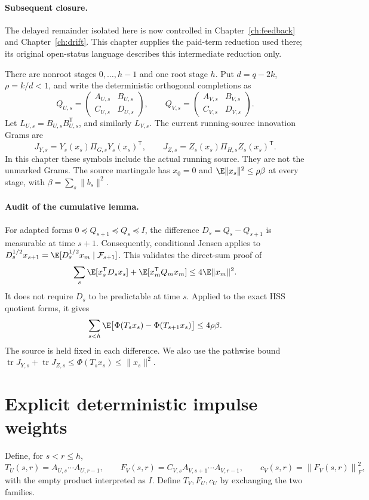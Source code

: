 \documentclass[11pt,oneside,openany,a4paper]{book}
\numberwithin{equation}{chapter}
\theoremstyle{definition}
\theoremstyle{remark}
\newcommand{\T}{\mathsf T}\newcommand{\Id}{I}
\newcommand{\F}[1]{\left\lVert#1\right\rVert_F}
\DeclareMathOperator{\tr}{tr}\DeclareMathOperator{\rank}{rank}
\begin{document}
\paragraph{Subsequent closure.}
The delayed remainder isolated here is now controlled in
Chapter~\ref{ch:feedback} and
Chapter~\ref{ch:drift}. This chapter supplies
the paid-term reduction used there; its original open-status language
describes this intermediate reduction only.

There are nonroot stages $0,\ldots,h-1$ and one root stage $h$.
Put $d=q-2k$, $\rho=k/d<1$, and write the deterministic orthogonal
completions as
\[
 Q_{U,s}=\begin{pmatrix}A_{U,s}&B_{U,s}\\C_{U,s}&D_{U,s}\end{pmatrix},
 \qquad
 Q_{V,s}=\begin{pmatrix}A_{V,s}&B_{V,s}\\C_{V,s}&D_{V,s}\end{pmatrix}.
\]
Let $L_{U,s}=B_{U,s}B_{U,s}^{\T}$, and similarly $L_{V,s}$.
The current running-source innovation Grams are
\[
 J_{Y,s}=Y_s(x_s)\Pi_{G,s}Y_s(x_s)^{\T},\qquad
 J_{Z,s}=Z_s(x_s)\Pi_{H,s}Z_s(x_s)^{\T}.
\]
In this chapter these symbols include the actual running source. They are
not the unmarked Grams. The source martingale has $x_0=0$ and
$\E\|x_s\|^2\le\rho\beta$ at every stage, with
$\beta=\sum_s\|b_s\|^2$.

\paragraph{Audit of the cumulative lemma.}
For adapted forms $0\preceq Q_{s+1}\preceq Q_s\preceq I$, the
difference $D_s=Q_s-Q_{s+1}$ is measurable at time $s+1$.
Consequently, conditional Jensen applies to
$D_s^{1/2}x_{s+1}=\E[D_s^{1/2}x_m\mid\mathcal F_{s+1}]$.
This validates the direct-sum proof of
\[
 \sum_s\E[x_s^{\T}D_sx_s]+\E[x_m^{\T}Q_mx_m]
 \le4\E\|x_m\|^2.
\]
It does not require $D_s$ to be predictable at time $s$.
Applied to the exact HSS quotient forms, it gives
\begin{equation}\label{delayed:eq:lossbudget}
 \sum_{s<h}\E\bigl[\Phi(T_sx_s)-\Phi(T_{s+1}x_s)\bigr]
 \le4\rho\beta.
\end{equation}
The source is held fixed in each difference. We also use the pathwise
bound $\tr J_{Y,s}+\tr J_{Z,s}\le\Phi(T_sx_s)\le\|x_s\|^2$.

\section{Explicit deterministic impulse weights}
Define, for $s<r\le h$,
\[
 T_U(s,r)=A_{U,s}\cdots A_{U,r-1},\qquad
 F_V(s,r)=C_{V,s}A_{V,s+1}\cdots A_{V,r-1},
 \qquad c_V(s,r)=\F{F_V(s,r)}^2,
\]
with the empty product interpreted as $I$. Define $T_V,F_U,c_U$
by exchanging the two families.
\end{document}
